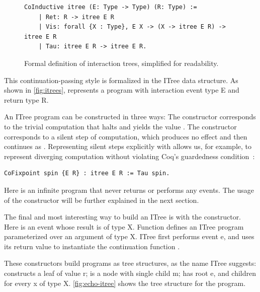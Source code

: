 \begin{figure}
  \begin{lstlisting}[style=customcoq]
    CoInductive itree (E: Type -> Type) (R: Type) :=
    | Ret: R -> itree E R
    | Vis: forall {X : Type}, E X -> (X -> itree E R) -> itree E R
    | Tau: itree E R -> itree E R.
  \end{lstlisting}
  \caption[Formal definition of interaction trees]{Formal definition of
    interaction trees, simplified for readability.}
  \label{fig:itrees}
\end{figure}

This continuation-passing style is formalized in the ITree data structure.  As
shown in \autoref{fig:itrees},  represents a program with
interaction event type \ilc E and return type \ilc R.

An ITree program can be constructed in three ways: The  constructor
corresponds to the trivial computation that halts and yields the value .
The  constructor corresponds to a silent step of computation, which
produces no effect and then continues as .  Representing silent steps
explicitly with  allows us, for example, to represent diverging
computation without violating Coq's guardedness condition~\cite{coinduction}:
\begin{lstlisting}[style=customcoq]
  CoFixpoint spin {E R} : itree E R := Tau spin.
\end{lstlisting}

Here  is an infinite program that never returns or performs any
events.  The usage of the  constructor will be further explained in the
next section.

The final and most interesting way to build an ITree is with the  constructor.  Here  is an event whose result is of type \ilc
X.  Function  defines an ITree program parameterized over an argument of
type \ilc X.  ITree  first performs event \ilc e, and uses its
return value  to instantiate the continuation function .

These constructors build programs as tree structures, as the name ITree
suggests:  constructs a leaf of value \ilc r;  is a
node with single child \ilc m;  has root \ilc e, and children
 for every \ilc x of type \ilc X.  \autoref{fig:echo-itree} shows the
tree structure for the  program.

